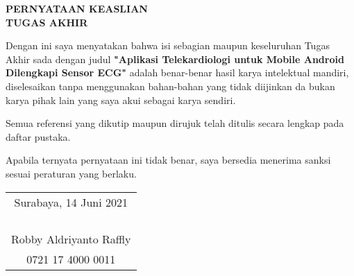 \begin{center}
  \large
  \textbf{PERNYATAAN KEASLIAN\\TUGAS AKHIR}
\end{center}

\thispagestyle{empty}

\vspace{2ex}


Dengan ini saya menyatakan bahwa isi sebagian maupun keseluruhan Tugas Akhir sada dengan judul \textbf{"Aplikasi Telekardiologi untuk Mobile Android Dilengkapi Sensor ECG"} adalah benar-benar hasil karya intelektual mandiri, diselesaikan tanpa menggunakan bahan-bahan yang tidak diijinkan da bukan karya pihak lain yang saya akui sebagai karya sendiri.

Semua referensi yang dikutip maupun dirujuk telah ditulis secara lengkap pada daftar pustaka.

Apabila ternyata pernyataan ini tidak benar, saya bersedia menerima sanksi sesuai peraturan yang berlaku.

\vspace{4ex}

\begin{flushright}
  \begin{tabular}[b]{c}
    Surabaya, 14 Juni 2021\\
    \\
    \\
    \\
    \\
    Robby Aldriyanto Raffly\\
    0721 17 4000 0011
  \end{tabular}
\end{flushright}
